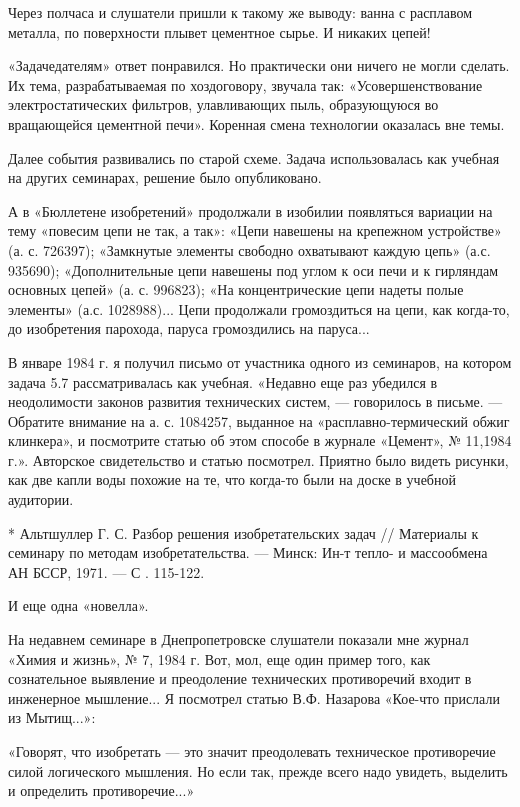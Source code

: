 Через полчаса и слушатели пришли к такому же выводу: ванна с расплавом
металла, по поверхности плывет цементное сырье. И никаких цепей!

«Задачедателям» ответ  понравился. Но практически они  ничего не могли
сделать.  Их  тема,  разрабатываемая   по  хоздоговору,  звучала  так:
«Усовершенствование  электростатических  фильтров, улавливающих  пыль,
образующуюся во вращающейся цементной печи». Коренная смена технологии
оказалась вне темы.

Далее события  развивались по старой схеме.  Задача использовалась как
учебная на других семинарах, решение было опубликовано.

А в «Бюллетене изобретений»  продолжали в изобилии появляться вариации
на тему  «повесим цепи  не так,  а так»:  «Цепи навешены  на крепежном
устройстве» (а.  с. 726397);  «Замкнутые элементы  свободно охватывают
каждую цепь»  (а.с. 935690);  «Дополнительные цепи навешены  под углом
к  оси  печи  и  к  гирляндам основных  цепей»  (а.  с.  996823);  «На
концентрические  цепи надеты  полые элементы»  (а.с. 1028988)...  Цепи
продолжали  громоздиться   на  цепи,  как  когда-то,   до  изобретения
парохода, паруса громоздились на паруса...

В январе  1984 г. я получил  письмо от участника одного  из семинаров,
на  котором  задача  5.7  рассматривалась как  учебная.  «Недавно  еще
раз  убедился в  неодолимости законов  развития технических  систем, —
говорилось в письме. — Обратите внимание на а. с. 1084257, выданное на
«расплавно-термический обжиг  клинкера», и  посмотрите статью  об этом
способе в журнале  «Цемент», № 11,1984 г.».  Авторское свидетельство и
статью  посмотрел. Приятно  было видеть  рисунки, как  две капли  воды
похожие на те, что когда-то были на доске в учебной аудитории.

* Альтшуллер Г. С. Разбор  решения изобретательских задач // Материалы
к  семинару  по  методам  изобретательства. —  Минск:  Ин-т  тепло-  и
массообмена АН БССР, 1971. — С . 115-122.


И еще одна «новелла».

На недавнем  семинаре в Днепропетровске слушатели  показали мне журнал
«Химия и  жизнь», №  7, 1984 г.  Вот, мол, еще  один пример  того, как
сознательное выявление и преодоление технических противоречий входит в
инженерное  мышление...  Я  посмотрел статью  В.Ф.  Назарова  «Кое-что
прислали из Мытищ...»:

«Говорят,  что  изобретать  —   это  значит  преодолевать  техническое
противоречие  силой логического  мышления. Но  если так,  прежде всего
надо увидеть, выделить и определить противоречие...»

